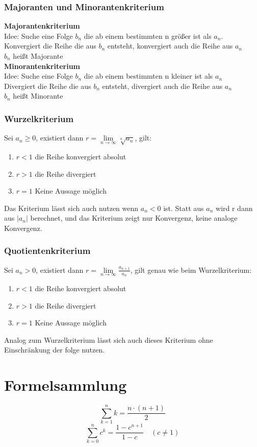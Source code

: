 \documentclass[12pt,a4paper]{article}
\begin{document}
\subsubsection{Majoranten und Minorantenkriterium}
\textbf{Majorantenkriterium}\\
Idee: Suche eine Folge $b_n$ die ab einem bestimmten n größer ist als $a_n$.\\
Konvergiert die Reihe die aus $b_n$ entsteht, konvergiert auch die Reihe aus $a_n$\\
$b_n$ heißt Majorante\\
\textbf{Minorantenkriterium}\\
Idee: Suche eine Folge $b_n$ die ab einem bestimmten n kleiner ist als $a_n$\\
Divergiert die Reihe die aus $b_n$ entsteht, divergiert auch die Reihe aus $a_n$\\
$b_n$ heißt Minorante\\

\subsubsection{Wurzelkriterium}
Sei $a_n\geq 0$, existiert dann $r = \lim\limits_{n\rightarrow\infty} \sqrt[n]{a_n}$, gilt:
\begin{enumerate}
	\item $r<1$		die Reihe konvergiert absolut
	\item $r>1$		die Reihe divergiert
	\item $r=1$		Keine Aussage möglich
\end{enumerate}
Das Kriterium lässt sich auch nutzen wenn $a_n<0$ ist. Statt aus $a_n$ wird r dann aus $|a_n|$ berechnet, und das Kriterium zeigt nur Konvergenz, keine analoge Konvergenz.

\subsubsection{Quotientenkriterium}
Sei $a_n> 0$, existiert dann $r = \lim\limits_{n\rightarrow\infty} \frac{a_{n+1}}{a_n}$, gilt genau wie beim Wurzelkriterium:
\begin{enumerate}
	\item $r<1$		die Reihe konvergiert absolut
	\item $r>1$		die Reihe divergiert
	\item $r=1$		Keine Aussage möglich
\end{enumerate}
Analog zum Wurzelkriterium lässt sich auch dieses Kriterium ohne Einschränkung der folge nutzen.

\pagebreak

\section{Formelsammlung}
\[\sum_{k=1}^nk=\frac{n\cdot(n+1)}{2}\]
\[\sum_{k=0}^nc^k=\frac{1-c^{n+1}}{1-c}\quad(c\neq 1)\]
\end{document}
